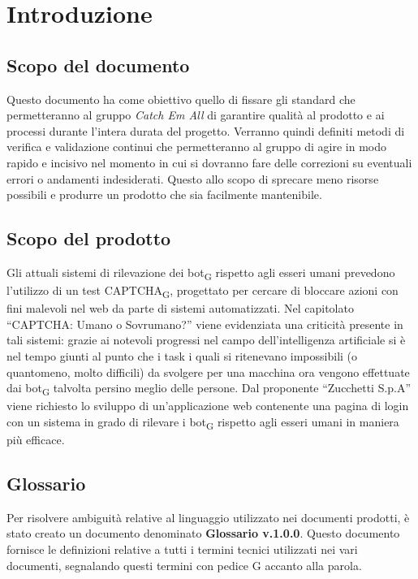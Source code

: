 \section{Introduzione}

\subsection{Scopo del documento}
Questo documento ha come obiettivo quello di fissare gli standard che permetteranno al gruppo \textit{Catch Em All} di garantire qualità al prodotto e ai processi durante l'intera durata del progetto. Verranno quindi definiti metodi di verifica e validazione continui che permetteranno al gruppo di agire in modo rapido e incisivo nel momento in cui si dovranno fare delle correzioni su eventuali errori o andamenti indesiderati. Questo allo scopo di sprecare meno risorse possibili e produrre un prodotto che sia facilmente mantenibile. 

\subsection{Scopo del prodotto}
Gli attuali sistemi di rilevazione dei bot\textsubscript{G} rispetto agli esseri umani prevedono l'utilizzo di un test CAPTCHA\textsubscript{G}, progettato per cercare di bloccare azioni con fini malevoli nel web da parte di sistemi automatizzati. Nel capitolato “CAPTCHA: Umano o Sovrumano?” viene evidenziata una criticità presente in tali sistemi: grazie ai notevoli progressi nel campo dell’intelligenza artificiale si è nel tempo giunti al punto che i task i quali si ritenevano impossibili (o quantomeno, molto difficili) da svolgere per una macchina ora vengono effettuate dai bot\textsubscript{G} talvolta persino meglio delle persone.
Dal proponente “Zucchetti S.p.A” viene richiesto lo sviluppo di un'applicazione web contenente una pagina di login con un sistema in grado di rilevare i bot\textsubscript{G} rispetto agli esseri umani in maniera più efficace.

\subsection{Glossario}
Per risolvere ambiguità relative al linguaggio utilizzato nei documenti prodotti, è stato creato un documento denominato \textbf{Glossario v.1.0.0}. Questo documento fornisce le definizioni relative a tutti i termini tecnici utilizzati nei vari documenti, segnalando questi termini con pedice G accanto alla parola.

